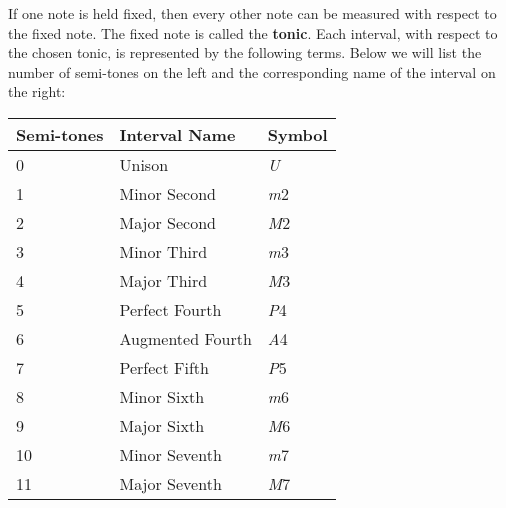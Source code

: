 \documentclass[12pt, a4paper]{article}
\begin{document}
    If one note is held fixed, then every other note can be measured with respect to the fixed note. The fixed note is called the \textbf{tonic}. Each interval, with respect to the chosen tonic, is represented by the following terms. Below we will list the number of semi-tones on the left and the corresponding name of the interval on the right:\par
    
\vspace{4mm}
    

\begin{center}
\begin{tabular}{ |p{2cm}||p{4.5cm}|p{2cm}|  }
 \hline
 Semi-tones & Interval Name & Symbol\\
 \hline
 
 \hspace{9mm}0  & Unison           & \hspace{7.5mm}\textsl{U}\\
 \hspace{9mm}1  & Minor Second     & \hspace{7.5mm}\textsl{m}2\\
 \hspace{9mm}2  & Major Second     & \hspace{7.5mm}\textsl{M}2\\
 \hspace{9mm}3  & Minor Third      & \hspace{7.5mm}\textsl{m}3\\
 \hspace{9mm}4  & Major Third      & \hspace{7.5mm}\textsl{M}3\\
 \hspace{9mm}5  & Perfect Fourth   & \hspace{7.5mm}\textsl{P}4\\
 \hspace{9mm}6  & Augmented Fourth & \hspace{7.5mm}\textsl{A}4\\
 \hspace{9mm}7  & Perfect Fifth    & \hspace{7.5mm}\textsl{P}5\\
 \hspace{9mm}8  & Minor Sixth      & \hspace{7.5mm}\textsl{m}6\\
 \hspace{9mm}9  & Major Sixth      & \hspace{7.5mm}\textsl{M}6\\
 \hspace{8mm}10 & Minor Seventh    & \hspace{7.5mm}\textsl{m}7\\
 \hspace{8mm}11 & Major Seventh    & \hspace{7.5mm}\textsl{M}7\\
 
 \hline
\end{tabular}
\end{center}
\end{document}
